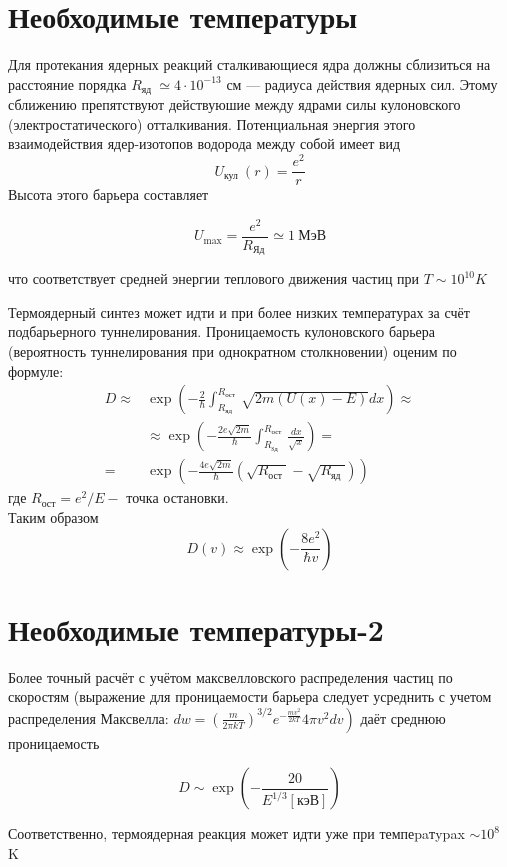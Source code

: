 \documentclass[12pt]{kiarticle} %
\begin{document}
\section{Необходимые температуры}

Для протекания ядерных реакций сталкивающиеся ядра должны сблизиться на расстояние порядка $R_{\text {яд }} \simeq 4 \cdot 10^{-13}$ см --- радиуса действия ядерных сил. Этому сближению препятствуют действуюшие между ядрами силы кулоновского (электростатического) отталкивания. Потенциальная энергия этого взаимодействия ядер-изотопов водорода между собой имеет вид
$$
U_{\text {кул }}(r)=\frac{e^{2}}{r}
$$
Высота этого барьера составляет

\[ U_{\max }=\frac{e^{2}}{R_{\text {Яд }}} \simeq 1 \ \text{МэВ} \]

что соответствует средней энергии теплового движения частиц при $T \sim 10^{10} K$

Термоядерный синтез может идти и при более низких температурах за счёт подбарьерного туннелирования. Проницаемость кулоновского барьера (вероятность туннелирования при однократном столкновении) оценим по формуле:
\[
\begin{aligned}
D \approx & \exp \left(-\frac{2}{\hbar} \int_{R_{\text {яд }}}^{R_{\text {ост }}} \sqrt{2 m(U(x)-E)} d x\right) \approx \\
& \approx \exp \left(-\frac{2 e \sqrt{2 m}}{\hbar} \int_{R_{\text {sд }}}^{R_{\text {ост }}} \frac{d x}{\sqrt{x}}\right)=\\
=& \exp \left(-\frac{4 e \sqrt{2 m}}{\hbar}\left(\sqrt{R_{\text {ост }}}-\sqrt{R_{\text {яд }}}\right)\right)
\end{aligned}
\]
где $R_{\text{ост}}=e^{2} / E-$ точка остановки. \\
Таким образом
$$
D(v) \approx \exp \left(-\frac{8 e^{2}}{\hbar v}\right)
$$

\section{Необходимые температуры-2}

Более точный расчёт с учётом максвелловского распределения частиц по скоростям (выражение для проницаемости барьера следует усреднить с учетом распределения Максвелла: $\left.d w=\left(\frac{m}{2 \pi k T}\right)^{3 / 2} e^{-\frac{m v^{2}}{2 k T}} 4 \pi v^{2} d v\right)$ даёт среднюю проницаемость

\[D \sim \exp \left(-\frac{20}{E^{1 / 3}[кэВ]}\right) \]

Соответственно, термоядерная реакция может идти уже при темпеpaтypax $\sim 10^{8}$ K
\end{document}
